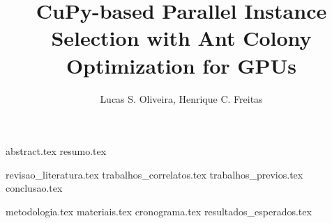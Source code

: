 \documentclass{article}
\title{CuPy-based Parallel Instance Selection with Ant Colony Optimization for GPUs}
\author{{Lucas S. Oliveira\inst{1}, Henrique C. Freitas\inst{1}}}
\begin{document}
 

\maketitle

{abstract.tex}
{resumo.tex}

{revisao_literatura.tex}
{trabalhos_correlatos.tex}
{trabalhos_previos.tex}
{conclusao.tex}

{metodologia.tex}
{materiais.tex}
{cronograma.tex}
{resultados_esperados.tex}

\printbibliography
\end{document}
